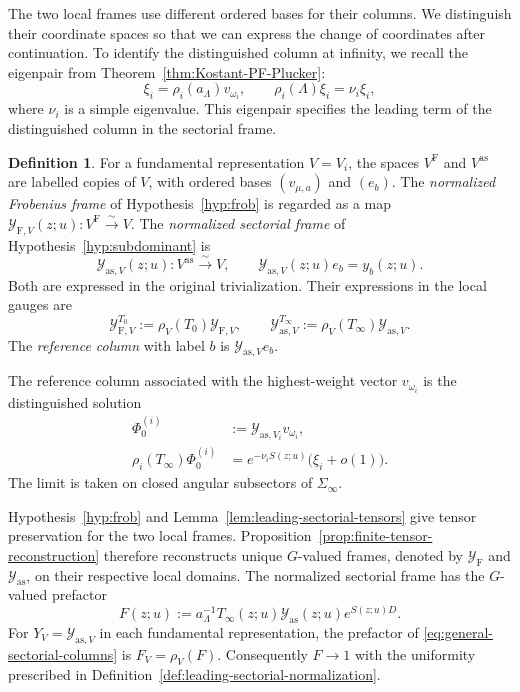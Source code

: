 \documentclass[11pt,leqno]{amsart}
\numberwithin{equation}{section}
\theoremstyle{plain}
\theoremstyle{definition}
\newtheorem{definition}[theorem]{Definition}
\theoremstyle{plain}
\theoremstyle{definition}
\theoremstyle{remark}
\begin{document}
The two local frames use different ordered bases for their columns.  We distinguish their coordinate spaces so that we can express the change of coordinates after continuation.  To identify the distinguished column at infinity, we recall the eigenpair from Theorem~\ref{thm:Kostant-PF-Plucker}:
\[
 \xi_i=\rho_i(a_\Lambda)v_{\omega_i},\qquad
 \rho_i(\Lambda)\xi_i=\nu_i\xi_i,
\]
where $\nu_i$ is a simple eigenvalue.  This eigenpair specifies the leading term of the distinguished column in the sectorial frame.

\begin{definition}\label{def:normalized-local-frames}\label{def:reference-columns}
For a fundamental representation $V=V_i$, the spaces $V^{\mathrm F}$ and $V^{\mathrm{as}}$ are labelled copies of $V$, with ordered bases $(v_{\mu,a})$ and $(e_b)$.  The \emph{normalized Frobenius frame} of Hypothesis~\ref{hyp:frob} is regarded as a map $\mathcal Y_{\mathrm F,V}(z;u):V^{\mathrm F}\xrightarrow{\sim}V$.  The \emph{normalized sectorial frame} of Hypothesis~\ref{hyp:subdominant} is
\[
 \mathcal Y_{\mathrm{as},V}(z;u):V^{\mathrm{as}}\xrightarrow{\sim}V,
 \qquad\mathcal Y_{\mathrm{as},V}(z;u)e_b=y_b(z;u).
\]
Both are expressed in the original trivialization.  Their expressions in the local gauges are
\begin{equation}\label{eq:local-gauges-returned-frames}
 \mathcal Y_{\mathrm F,V}^{T_0}:=\rho_V(T_0)\mathcal Y_{\mathrm F,V},\qquad
 \mathcal Y_{\mathrm{as},V}^{T_\infty}:=\rho_V(T_\infty)\mathcal Y_{\mathrm{as},V}.
\end{equation}
The \emph{reference column} with label $b$ is $\mathcal Y_{\mathrm{as},V}e_b$.

The reference column associated with the highest-weight vector $v_{\omega_i}$ is the distinguished solution
\begin{equation}\label{eq:general-subdominant}
 \begin{aligned}
 \Phi_0^{(i)}&:=\mathcal Y_{\mathrm{as},V_i}v_{\omega_i},\\
 \rho_i(T_\infty)\Phi_0^{(i)}
 &=e^{-\nu_iS(z;u)}\bigl(\xi_i+o(1)\bigr).
 \end{aligned}
\end{equation}
The limit is taken on closed angular subsectors of $\Sigma_\infty$.
\end{definition}

Hypothesis~\ref{hyp:frob} and Lemma~\ref{lem:leading-sectorial-tensors} give tensor preservation for the two local frames.  Proposition~\ref{prop:finite-tensor-reconstruction} therefore reconstructs unique $G$-valued frames, denoted by $\mathcal Y_{\mathrm F}$ and $\mathcal Y_{\mathrm{as}}$, on their respective local domains.
The normalized sectorial frame has the $G$-valued prefactor
\begin{equation}\label{eq:group-sectorial-prefactor}
 F(z;u):=a_\Lambda^{-1}T_\infty(z;u)\mathcal Y_{\mathrm{as}}(z;u)
             e^{S(z;u)D}.
\end{equation}
For $Y_V=\mathcal Y_{\mathrm{as},V}$ in each fundamental representation, the prefactor of \eqref{eq:general-sectorial-columns} is $F_V=\rho_V(F)$.  Consequently $F\to1$ with the uniformity prescribed in Definition~\ref{def:leading-sectorial-normalization}.
\end{document}
